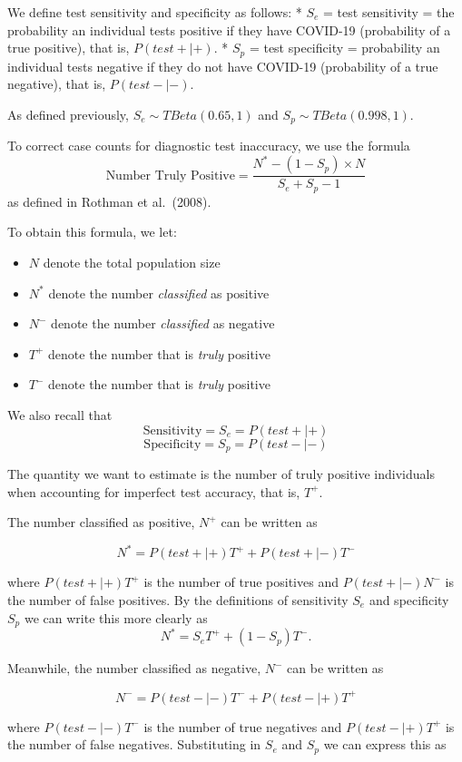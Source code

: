 \documentclass[12pt,twoside]{smiththesis}
\providecommand{\tightlist}{%
  \setlength{\itemsep}{0pt}\setlength{\parskip}{0pt}}
\begin{document}
We define test sensitivity and specificity as follows:
* \(S_e\) = test sensitivity = the probability an individual tests positive if they have COVID-19 (probability of a true positive), that is, \(P(test + | +)\).
* \(S_p\) = test specificity = probability an individual tests negative if they do not have COVID-19 (probability of a true negative), that is, \(P(test - |-)\).

As defined previously, \(S_e \sim TBeta(0.65, 1)\) and \(S_p \sim TBeta(0.998, 1)\).

To correct case counts for diagnostic test inaccuracy, we use the formula
\[\text{Number Truly Positive} = \dfrac{N^*- (1-S_p) \times N}{S_e+S_p-1}\]
as defined in Rothman et al.~(2008).

To obtain this formula, we let:
\begin{itemize}
\tightlist
\item
  \(N\) denote the total population size
\item
  \(N^*\) denote the number \emph{classified} as positive
\item
  \(N^-\) denote the number \emph{classified} as negative
\item
  \(T^+\) denote the number that is \emph{truly} positive
\item
  \(T^-\) denote the number that is \emph{truly} positive
\end{itemize}
We also recall that
\[ \text{Sensitivity} = S_e = P(test + | +) \]
\[ \text{Specificity} = S_p = P(test - | - ) \]

The quantity we want to estimate is the number of truly positive individuals when accounting for imperfect test accuracy, that is, \(T^+\).

The number classified as positive, \(N^+\) can be written as

\[ N^* = P(test + | +) T^+ + P(test + | -) T^-\]

where \(P(test + | +) T^+\) is the number of true positives and \(P(test + | -) N^-\) is the number of false positives. By the definitions of sensitivity \(S_e\) and specificity \(S_p\) we can write this more clearly as
\[ N^* =S_e T^+ + (1-S_p) T^-.\]

Meanwhile, the number classified as negative, \(N^-\) can be written as

\[ N^- = P(test - | -) T^- + P(test - | +) T^+\]

where \(P(test - | -) T^-\) is the number of true negatives and \(P(test - | +) T^+\) is the number of false negatives. Substituting in \(S_e\) and \(S_p\) we can express this as
\end{document}
